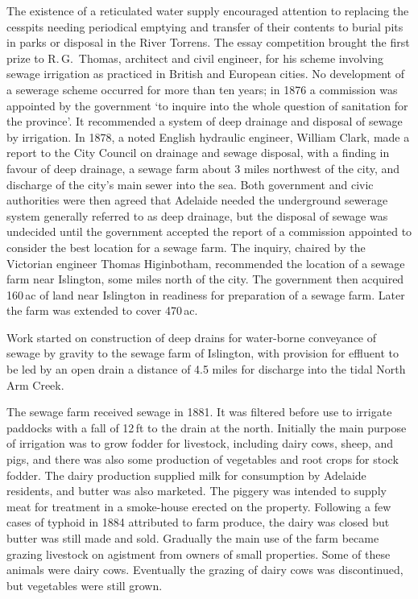 The existence of a reticulated water supply encouraged attention to
replacing the cesspits needing periodical emptying and transfer of
their contents to burial pits in parks or disposal in the River
Torrens.  The essay competition brought the first prize to
R.\,G.~Thomas, architect and civil engineer, for his scheme involving
sewage irrigation as practiced in British and European
cities.  No development of a sewerage scheme
occurred for more than ten years; in 1876 a commission was appointed
by the government `to inquire into the whole question of sanitation
for the province'.  It recommended a system of deep drainage and
disposal of sewage by irrigation.  In 1878,
a noted English hydraulic engineer, William Clark, made a report to
the City Council on drainage and sewage disposal, with a finding in
favour of deep drainage, a sewage farm about 3 miles northwest of the
city, and discharge of the city's main sewer into the sea.  Both government and civic authorities were
then agreed that Adelaide needed the underground sewerage system
generally referred to as deep drainage, but the disposal of sewage was
undecided until the government accepted the report of a commission
appointed to consider the best location for a sewage farm.  The
inquiry, chaired by the Victorian engineer Thomas Higinbotham,
recommended the location of a sewage farm near Islington, some miles
north of the city.  The government then
acquired 160\,ac of land near Islington in readiness for preparation
of a sewage farm. Later the farm was extended to cover
470\,ac.

Work started on construction of deep drains for water-borne conveyance
of sewage by gravity to the sewage farm of Islington, with provision
for effluent to be led by an open drain a distance of 4.5 miles for
discharge into the tidal North Arm Creek.

The sewage farm received sewage in 1881.  It was filtered before use
to irrigate paddocks with a fall of 12\,ft to the drain at the north.
Initially the main purpose of irrigation was to grow fodder for
livestock, including dairy cows, sheep, and pigs, and there was also
some production of vegetables and root crops for stock fodder.  The
dairy production supplied milk for consumption by Adelaide residents,
and butter was also marketed.  The piggery was intended to supply meat
for treatment in a smoke-house erected on the property.  Following a
few cases of typhoid in 1884 attributed to farm produce, the dairy was
closed but butter was still made and sold.  Gradually the main use of
the farm became grazing livestock on agistment from owners of small
properties.  Some of these animals were dairy cows.  Eventually the
grazing of dairy cows was discontinued, but vegetables were still
grown.

